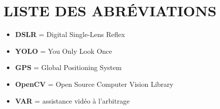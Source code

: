 \chapter*{LISTE DES ABRÉVIATIONS}
\adjustmtc
\thispagestyle{MyStyle}

\begin{itemize}[label=--]
	\item \textbf{DSLR} = Digital Single-Lens Reflex
	\item \textbf{YOLO} = You Only Look Once
	\item \textbf{GPS} = Global Positioning System
	\item \textbf{OpenCV} = Open Source Computer Vision Library
	\item \textbf{VAR} = assistance vidéo à l'arbitrage
 
\end{itemize}
 























